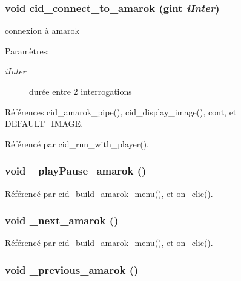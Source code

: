 \subsubsection{\setlength{\rightskip}{0pt plus 5cm}void cid\_\-connect\_\-to\_\-amarok (gint {\em iInter})}\label{cid-amarok_8c_ec1db8f742994eab62d6d815edd96085}


connexion à amarok \begin{Desc}
\item[Paramètres:]
\begin{description}
\item[{\em iInter}]durée entre 2 interrogations \end{description}
\end{Desc}


Références cid\_\-amarok\_\-pipe(), cid\_\-display\_\-image(), cont, et DEFAULT\_\-IMAGE.

Référencé par cid\_\-run\_\-with\_\-player().
\subsubsection{\setlength{\rightskip}{0pt plus 5cm}void \_\-playPause\_\-amarok ()}\label{cid-amarok_8c_4131a554c2a5eb15ee79bdd715adfb6e}




Référencé par cid\_\-build\_\-amarok\_\-menu(), et on\_\-clic().
\subsubsection{\setlength{\rightskip}{0pt plus 5cm}void \_\-next\_\-amarok ()}\label{cid-amarok_8c_b1f357503caf1b615a104f2393b9f1bd}




Référencé par cid\_\-build\_\-amarok\_\-menu(), et on\_\-clic().
\subsubsection{\setlength{\rightskip}{0pt plus 5cm}void \_\-previous\_\-amarok ()}\label{cid-amarok_8c_8ebe01c6bd996f5e7192e8f3b81e37a0}




